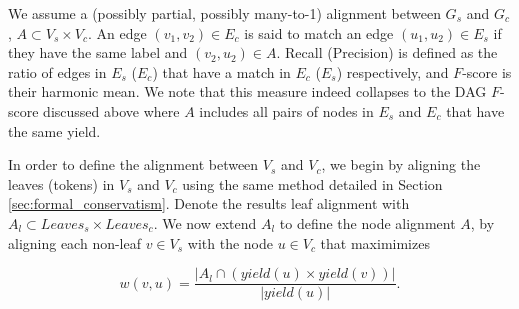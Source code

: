 \documentclass[letter,11pt]{article}
\begin{document}


We assume a (possibly partial, possibly many-to-1) alignment between $G_s$ and $G_c$,
$A \subset V_s \times V_c$. An edge $(v_1,v_2) \in E_c$ is said to match an edge
$(u_1,u_2) \in E_s$ if they have the same label and $(v_2,u_2) \in A$. Recall (Precision)
is defined as the ratio of edges in $E_s$ ($E_c$) that have a match in $E_c$ ($E_s$) respectively, and
$F$-score is their harmonic mean. We note that this measure indeed collapses to the
DAG $F$-score discussed above where $A$ includes all pairs of nodes in $E_s$ and $E_c$ that have
the same yield.

In order to define the alignment between $V_s$ and $V_c$, we begin by aligning the leaves
(tokens) in $V_s$ and $V_c$ using the same method detailed in Section \ref{sec:formal_conservatism}.
Denote the results leaf alignment with $A_l \subset Leaves_s \times Leaves_c$.
We now extend $A_l$ to define the node alignment $A$, by aligning each non-leaf $v \in V_s$
with the node $u \in V_c$ that maximimizes 

\begin{small}
  \centering
  \begin{equation}
    w(v,u) = \frac{\vert A_l \cap (yield(u) \times yield(v))\vert}{\vert yield(u) \vert}.
  \end{equation}
\end{small}
\end{document}

